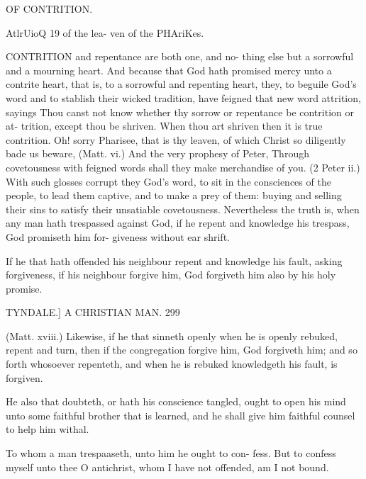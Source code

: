 \documentclass{custom}
\begin{document}
{OF CONTRITION. 

AtlrUioQ 19 
of the lea- 
ven of the 
PHAriKes. 

CONTRITION and repentance are both one, and no- 
thing else but a sorrowful and a mourning heart. And 
because that God hath promised mercy unto a contrite heart, 
that is, to a sorrowful and repenting heart, they, to beguile 
God's word and to stablish their wicked tradition, have 
feigned that new word attrition, sayings Thou canst not 
know whether thy sorrow or repentance be contrition or at- 
trition, except thou be shriven. When thou art shriven then 
it is true contrition. Oh! sorry Pharisee, that is thy leaven, 
of which Christ so diligently bade us beware, (Matt. vi.) 
And the very prophesy of Peter, Through covetousness 
with feigned words shall they make merchandise of you. 
(2 Peter ii.) With such glosses corrupt they God's word, to 
sit in the consciences of the people, to lead them captive, 
and to make a prey of them: buying and selling their sins 
to satisfy their unsatiable covetousness. Nevertheless the 
truth is, when any man hath trespassed against God, if he 
repent and knowledge his trespass, God promiseth him for- 
giveness without ear shrift. 

If he that hath offended his neighbour repent and 
knowledge his fault, asking forgiveness, if his neighbour 
forgive him, God forgiveth him also by his holy promise. 


TYNDALE.]
A CHRISTIAN MAN.
299

(Matt. xviii.) Likewise, if he that sinneth openly when he is 
openly rebuked, repent and turn, then if the congregation 
forgive him, God forgiveth him; and so forth whosoever 
repenteth, and when he is rebuked knowledgeth his fault, is 
forgiven.

He also that doubteth, or hath his conscience tangled, 
ought to open his mind unto some faithful brother that is 
learned, and he shall give him faithful counsel to help him 
withal.

To whom a man trespaaseth, unto him he ought to con-
fess. But to confess myself unto thee O antichrist, whom I 
have not offended, am I not bound. 

}
\end{document}
